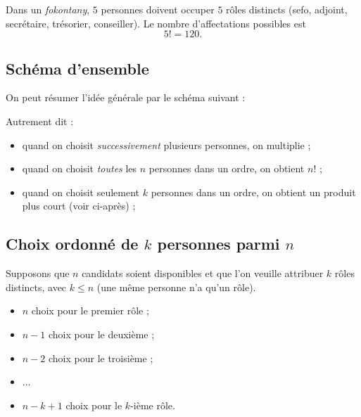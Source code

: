 \documentclass[11pt]{article}
\begin{document}
\begin{exemple}
Dans un \emph{fokontany}, \(5\) personnes doivent occuper \(5\) rôles distincts
(sefo, adjoint, secrétaire, trésorier, conseiller).
Le nombre d’affectations possibles est
\[
5! = 120.
\]
\end{exemple}

\subsection{Schéma d’ensemble}\label{sec:schema-ensemble}

On peut résumer l’idée générale par le schéma suivant :

\begin{center}
\end{center}

Autrement dit :
\begin{itemize}
    \item quand on choisit \emph{successivement} plusieurs personnes, on multiplie ;
    \item quand on choisit \emph{toutes} les \(n\) personnes dans un ordre, on obtient \(n!\) ;
    \item quand on choisit seulement \(k\) personnes dans un ordre, on obtient un produit plus court (voir ci-après) ;
\end{itemize}

\subsection{Choix ordonné de \(k\) personnes parmi \(n\)}\label{sec:choix-ordonne}

Supposons que \(n\) candidats soient disponibles et que l’on veuille attribuer
\(k\) rôles distincts, avec \(k\le n\) (une même personne n’a qu’un rôle).

\begin{itemize}
    \item \(n\) choix pour le premier rôle ;
    \item \(n-1\) choix pour le deuxième ;
    \item \(n-2\) choix pour le troisième ;
    \item \(\dots\)
    \item \(n-k+1\) choix pour le \(k\)-ième rôle.
\end{itemize}
\end{document}
